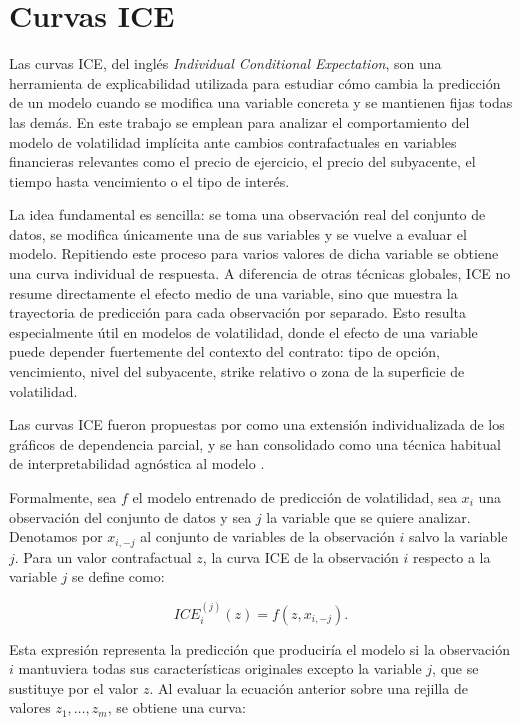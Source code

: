 \chapter{Curvas ICE}
\label{app:ice}

Las curvas ICE, del inglés \emph{Individual Conditional Expectation}, son una herramienta de explicabilidad utilizada para estudiar cómo cambia la predicción de un modelo cuando se modifica una variable concreta y se mantienen fijas todas las demás. En este trabajo se emplean para analizar el comportamiento del modelo de volatilidad implícita ante cambios contrafactuales en variables financieras relevantes como el precio de ejercicio, el precio del subyacente, el tiempo hasta vencimiento o el tipo de interés.

La idea fundamental es sencilla: se toma una observación real del conjunto de datos, se modifica únicamente una de sus variables y se vuelve a evaluar el modelo. Repitiendo este proceso para varios valores de dicha variable se obtiene una curva individual de respuesta. A diferencia de otras técnicas globales, ICE no resume directamente el efecto medio de una variable, sino que muestra la trayectoria de predicción para cada observación por separado. Esto resulta especialmente útil en modelos de volatilidad, donde el efecto de una variable puede depender fuertemente del contexto del contrato: tipo de opción, vencimiento, nivel del subyacente, strike relativo o zona de la superficie de volatilidad.

Las curvas ICE fueron propuestas por \citet{goldstein2015ice} como una extensión individualizada de los gráficos de dependencia parcial, y se han consolidado como una técnica habitual de interpretabilidad agnóstica al modelo \citep{molnar2022iml}.

Formalmente, sea \(f\) el modelo entrenado de predicción de volatilidad, sea \(x_i\) una observación del conjunto de datos y sea \(j\) la variable que se quiere analizar. Denotamos por \(x_{i,-j}\) al conjunto de variables de la observación \(i\) salvo la variable \(j\). Para un valor contrafactual \(z\), la curva ICE de la observación \(i\) respecto a la variable \(j\) se define como:

\begin{equation}
ICE_i^{(j)}(z)=f(z,x_{i,-j}).
\label{eq:ice}
\end{equation}

Esta expresión representa la predicción que produciría el modelo si la observación \(i\) mantuviera todas sus características originales excepto la variable \(j\), que se sustituye por el valor \(z\). Al evaluar la ecuación anterior sobre una rejilla de valores \(z_1,\ldots,z_m\), se obtiene una curva:

